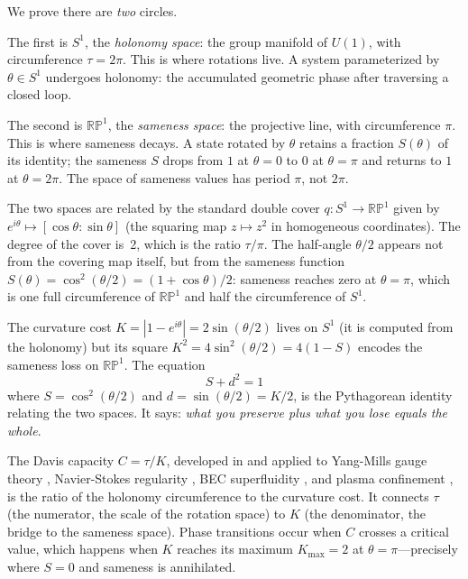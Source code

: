 \documentclass[11pt,letterpaper]{article}
\begin{document}
We prove there are \emph{two} circles.

The first is $S^1$, the \emph{holonomy space}: the group manifold of $U(1)$, with circumference $\tau = 2\pi$. This is where rotations live. A system parameterized by $\theta \in S^1$ undergoes holonomy: the accumulated geometric phase after traversing a closed loop.

The second is $\mathbb{RP}^1$, the \emph{sameness space}: the projective line, with circumference $\pi$. This is where sameness decays. A state rotated by $\theta$ retains a fraction $S(\theta)$ of its identity; the sameness $S$ drops from $1$ at $\theta = 0$ to $0$ at $\theta = \pi$ and returns to $1$ at $\theta = 2\pi$. The space of sameness values has period $\pi$, not $2\pi$.

The two spaces are related by the standard double cover $q: S^1 \to \mathbb{RP}^1$ given by $e^{i\theta} \mapsto [\cos\theta : \sin\theta]$ (the squaring map $z \mapsto z^2$ in homogeneous coordinates). The degree of the cover is~2, which is the ratio $\tau/\pi$. The half-angle $\theta/2$ appears not from the covering map itself, but from the sameness function $S(\theta) = \cos^2(\theta/2) = (1 + \cos\theta)/2$: sameness reaches zero at $\theta = \pi$, which is one full circumference of $\mathbb{RP}^1$ and half the circumference of $S^1$.

The curvature cost $K = |1 - e^{i\theta}| = 2\sin(\theta/2)$ lives on $S^1$ (it is computed from the holonomy) but its square $K^2 = 4\sin^2(\theta/2) = 4(1 - S)$ encodes the sameness loss on $\mathbb{RP}^1$. The equation
\begin{equation}\label{eq:main}
\boxed{S + d^2 = 1}
\end{equation}
where $S = \cos^2(\theta/2)$ and $d = \sin(\theta/2) = K/2$, is the Pythagorean identity relating the two spaces. It says: \emph{what you preserve plus what you lose equals the whole}.

The Davis capacity $C = \tau/K$, developed in \cite{davis2025} and applied to Yang-Mills gauge theory \cite{davis2025ym}, Navier-Stokes regularity \cite{davis2026ns}, BEC superfluidity \cite{davis2026bec}, and plasma confinement \cite{davis2026plasma}, is the ratio of the holonomy circumference to the curvature cost. It connects $\tau$ (the numerator, the scale of the rotation space) to $K$ (the denominator, the bridge to the sameness space). Phase transitions occur when $C$ crosses a critical value, which happens when $K$ reaches its maximum $K_{\max} = 2$ at $\theta = \pi$---precisely where $S = 0$ and sameness is annihilated.
\end{document}
